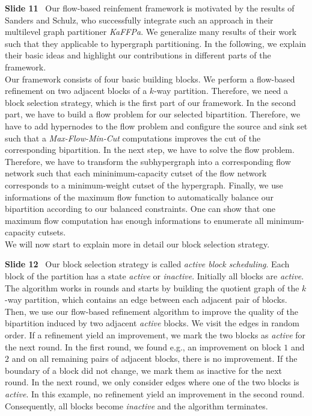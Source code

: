 \documentclass[11pt]{llncs}
\newcommand{\fakepar}[1]{\medskip\par\textbf{#1}\ }
\begin{document}
\fakepar{Slide 11} Our flow-based reinfement framework is motivated by the results of
Sanders and Schulz, who successfully integrate such an approach in their multilevel 
graph partitioner \emph{KaFFPa}. We generalize many results of their work such that they
applicable to hypergraph partitioning. In the following, we explain their basic ideas and
highlight our contributions in different parts of the framework.\\
Our framework consists of four basic building blocks. We perform a flow-based refinement on
two adjacent blocks of a $k$-way partition. Therefore, we need a block selection strategy, which is
the first part of our framework. In the second part, we have to build a flow problem for our
selected bipartition. Therefore, we have to add hypernodes to the flow problem and configure the source
and sink set such that a \emph{Max-Flow-Min-Cut} computations improves the cut of the corresponding
bipartition. In the next step, we have to solve the flow problem. Therefore, we have to transform 
the subhypergraph into a corresponding flow network such that each mininimum-capacity cutset 
of the flow network corresponds to a minimum-weight cutset of the hypergraph. Finally, we use
informations of the maximum flow function to automatically balance our bipartition according
to our balanced constraints. One can show that one maximum flow computation has enough informations
to enumerate all minimum-capacity cutsets. \\
We will now start to explain more in detail our block selection strategy.

\fakepar{Slide 12} Our block selection strategy is called \emph{active block scheduling}.
Each block of the partition has a state \emph{active} or \emph{inactive}. Initially all blocks
are \emph{active}. The algorithm works in rounds and starts by building the quotient graph
of the $k$-way partition, which contains an edge between each adjacent pair of blocks.
Then, we use our flow-based refinement algorithm to improve
the quality of the bipartition induced by two adjacent \emph{active} blocks. We visit the
edges in random order. If a refinement yield an improvement, we mark the two blocks as \emph{active}
for the next round. In the first round, we found e.g., an improvement on block $1$ and $2$ and on
all remaining pairs of adjacent blocks, there is no improvement. If the boundary of a block did not 
change, we mark them as inactive for the next round. In the next round, we only consider edges
where one of the two blocks is \emph{active}. In this example, no refinement yield an improvement
in the second round. Consequently, all blocks become \emph{inactive} and the algorithm
terminates.
\end{document}
